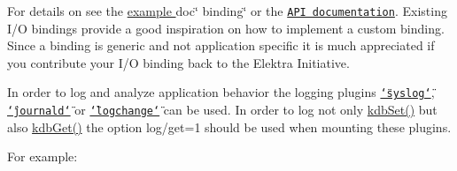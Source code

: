 For details on see the \hyperlink{md_src_bindings_io_doc_README_src_bindings_io_doc_README_md}{example }doc\char`\"{} binding\char`\"{} or the \href{https://doc.libelektra.org/api/latest/html/group__kdbio.html}{\tt A\+PI documentation}. Existing I/O bindings provide a good inspiration on how to implement a custom binding. Since a binding is generic and not application specific it is much appreciated if you contribute your I/O binding back to the Elektra Initiative.

In order to log and analyze application behavior the logging plugins \href{https://www.libelektra.org/plugins/syslog}{\tt \char`\"{}syslog\char`\"{}}, \href{https://www.libelektra.org/plugins/journald}{\tt \char`\"{}journald\char`\"{}} or \href{https://www.libelektra.org/plugins/logchange}{\tt \char`\"{}logchange\char`\"{}} can be used. In order to log not only {\ttfamily \hyperlink{group__kdb_ga11436b058408f83d303ca5e996832bcf}{kdb\+Set()}} but also {\ttfamily \hyperlink{group__kdb_ga28e385fd9cb7ccfe0b2f1ed2f62453a1}{kdb\+Get()}} the option {\ttfamily log/get=1} should be used when mounting these plugins.

For example\+:


 